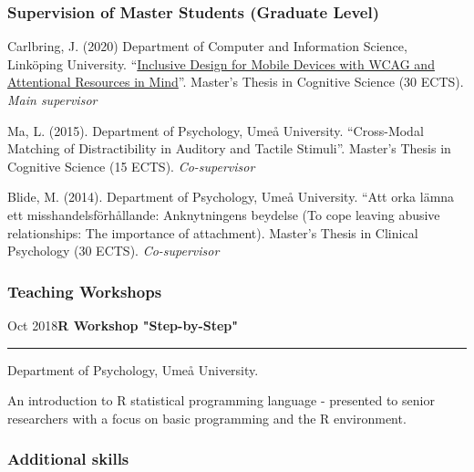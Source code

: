 \documentclass[]{article}
\begin{document}
\subsubsection{Supervision of Master Students (Graduate
Level)}\label{supervision-of-master-students-graduate-level}

Carlbring, J. (2020) Department of Computer and Information Science,
Linköping University.
``\href{http://liu.diva-portal.org/smash/record.jsf?dswid=-6296&faces-redirect=true&language=en&searchType=SIMPLE&query=Marsja&af=\%5B\%5D&aq=\%5B\%5B\%5D\%5D&aq2=\%5B\%5B\%5D\%5D&aqe=\%5B\%5D&pid=diva2\%3A1441358&noOfRows=50&sortOrder=author_sort_asc&sortOrder2=title_sort_asc&onlyFullText=false&sf=undergraduate}{Inclusive
Design for Mobile Devices with WCAG and Attentional Resources in
Mind}''. Master's Thesis in Cognitive Science (30 ECTS). \emph{Main
supervisor}

Ma, L. (2015). Department of Psychology, Umeå University. ``Cross-Modal
Matching of Distractibility in Auditory and Tactile Stimuli''. Master's
Thesis in Cognitive Science (15 ECTS). \emph{Co-supervisor}

Blide, M. (2014). Department of Psychology, Umeå University. ``Att orka
lämna ett misshandelsförhållande: Anknytningens beydelse (To cope
leaving abusive relationships: The importance of attachment). Master's
Thesis in Clinical Psychology (30 ECTS). \emph{Co-supervisor}

\subsubsection{Teaching Workshops}\label{teaching-workshops}

Oct 2018\hspace{0.75cm}\textbf{R Workshop "Step-by-Step"}\vspace{1mm}

\hrule
\begin{changemargin}{2.15cm}{2.4cm}


Department of Psychology, Umeå University.

An introduction to R statistical programming language - presented to senior researchers with a focus on basic programming and the R environment.

\end{changemargin}

\subsubsection{Additional skills}\label{additional-skills}
\end{document}
